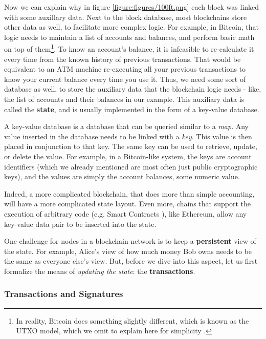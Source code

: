 Now we can explain why in figure \ref{figure:figures/100ft.png} each block was linked with some
auxillary data. Next to the block database, most blockchains store other data as well, to facilitate
more complex logic. For example, in Bitcoin, that logic needs to maintain a list of accounts and
balances, and perform basic math on top of them\footnote{In reality, Bitcoin does something slightly
different, which is known as the UTXO model, which we omit to explain here for simplicity
\cite{delgado-seguraAnalysisBitcoinUTXO2017}.}. To know an account's balance, it is infeasible to
re-calculate it every time from the known history of previous transactions. That would be equivalent
to an ATM machine re-executing all your previous transactions to know your current balance every
time you use it. Thus, we need some sort of database as well, to store the auxiliary data that the
blockchain logic needs - like, the list of accounts and their balances in our example. This
auxiliary data is called the \textbf{state}, and is usually implemented in the form of a key-value
database.

A key-value database is a database that can be queried similar to a \textit{map}. Any value inserted
in the database needs to be linked with a \textit{key}. This value is then placed in conjunction to
that key. The same key can be used to retrieve, update, or delete the value. For example, in a
Bitcoin-like system, the keys are account identifiers (which we already mentioned are most often
just public cryptographic keys), and the values are simply the account balances, some numeric value.

Indeed, a more complicated blockchain, that does more than simple accounting, will have a more
complicated state layout. Even more, chains that support the execution of arbitrary code (e.g. Smart
Contracts \cite{EthereumWhitepaper}), like Ethereum, allow any key-value data pair to be inserted
into the state.

One challenge for nodes in a blockchain network is to keep a \textbf{persistent} view of the state.
For example, Alice's view of how much money Bob owns needs to be the same as everyone else's view.
But, before we dive into this aspect, let us first formalize the means of \textit{updating the
state}: the \textbf{transactions}.

\subsubsection{Transactions and Signatures} \label{chap_bg:subsec:transaction_sig}

